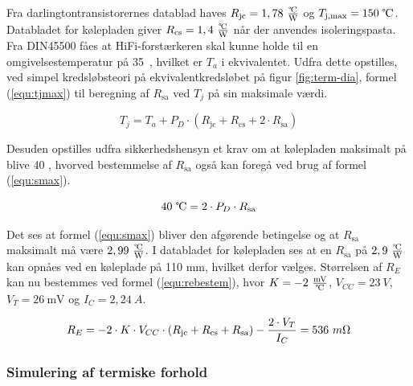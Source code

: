 Fra darlingtontransistorernes datablad haves $R_{\mathrm{jc}} = 1,78~\tfrac{\celsius}{\mathrm{W}}$ og $T_{\mathrm{j,max}} = 150~\celsius$. Databladet for kølepladen giver $R_{\mathrm{cs}} = 1,4~\tfrac{\celsius}{\mathrm{W}}$ når der anvendes isoleringspasta. Fra DIN45500  fåes at HiFi-forstærkeren skal kunne holde til en omgivelsestemperatur på 35~\celsius, hvilket er $T_a$ i ekvivalentet. Udfra dette opstilles, ved simpel kredsløbsteori på ekvivalentkredsløbet på figur \ref{fig:term-dia}, formel (\ref{equ:tjmax}) til beregning af $R_{\mathrm{sa}}$ ved $T_j$  på sin maksimale værdi. 

\begin{equation}
\label{equ:tjmax}
T_j = T_a + P_D \cdot (R_{\mathrm{jc}} + R_{\mathrm{cs}} + 2 \cdot R_{\mathrm{sa}})
\end{equation}

Desuden opstilles udfra sikkerhedshensyn et krav om at kølepladen maksimalt på blive 40 \celsius, hvorved bestemmelse af $R_{\mathrm{sa}}$ også kan foregå ved brug af formel (\ref{equ:smax}). 

\begin{equation}
\label{equ:smax}
40~\celsius = 2 \cdot P_D \cdot R_{\mathrm{sa}}
\end{equation}

Det ses at formel (\ref{equ:smax}) bliver den afgørende betingelse og at $R_{\mathrm{sa}}$ maksimalt må være $2,99~\tfrac{\celsius}{\mathrm{W}}$. I databladet for kølepladen ses at en $R_{\mathrm{sa}}$ på $2,9~\tfrac{\celsius}{\mathrm{W}}$ kan opnåes ved en køleplade på 110 mm, hvilket derfor vælges. Størrelsen af $R_E$ kan nu bestemmes ved formel (\ref{equ:rebestem}), hvor $K = - 2~\tfrac{\mathrm{mV}}{\celsius}$, $V_{CC} = 23~V$, $V_T = 26~\mathrm{mV}$ og $I_C = 2,24~A$.

\begin{equation}
\label{equ:rebestem}
R_E = - 2 \cdot K \cdot V_{CC} \cdot (R_{\mathrm{jc}} + R_{\mathrm{cs}} + R_{\mathrm{sa}}) - \frac{2 \cdot V_T}{I_C} = 536~m\ohm
\end{equation}

\subsubsection*{Simulering af termiske forhold}

